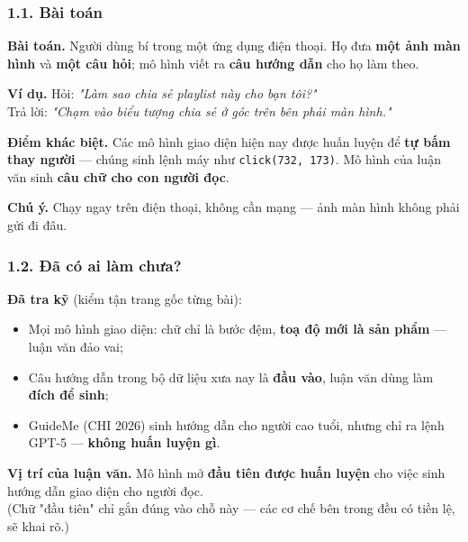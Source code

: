 \documentclass[10pt]{beamer}
\newcommand{\dn}[1]{{\color{dnteal}\textbf{#1}}}
\newcommand{\vd}[1]{{\color{vdblue}\textbf{#1}}}
\newcommand{\ann}[1]{{\color{annmar}\textbf{#1}}}
\newcommand{\nv}[1]{{\color{daunavy}\textbf{#1}}}
\begin{document}
\begin{frame}
  \frametitle{1.1. Bài toán}
  \begin{block}{}
    \dn{Bài toán.} Người dùng bí trong một ứng dụng điện thoại. Họ đưa \nv{một ảnh màn hình} và \nv{một câu hỏi}; mô hình viết ra \nv{câu hướng dẫn} cho họ làm theo.
  \end{block}
  \begin{block}{}
    \vd{Ví dụ.} Hỏi: \textit{"Làm sao chia sẻ playlist này cho bạn tôi?"}\\[1.2ex]
    Trả lời: \textit{"Chạm vào biểu tượng chia sẻ ở góc trên bên phải màn hình."}
  \end{block}
  \vspace{1ex}
  \dn{Điểm khác biệt.} Các mô hình giao diện hiện nay được huấn luyện để \nv{tự bấm thay người} --- chúng sinh lệnh máy như \texttt{click(732,\,173)}. Mô hình của luận văn sinh \nv{câu chữ cho con người đọc}.
  \vspace{1.2ex}

  \ann{Chú ý.} Chạy ngay trên điện thoại, không cần mạng --- ảnh màn hình không phải gửi đi đâu.
\end{frame}

\begin{frame}
  \frametitle{1.2. Đã có ai làm chưa?}
  \begin{block}{}
    \dn{Đã tra kỹ} (kiểm tận trang gốc từng bài):
    \begin{itemize}
      \item Mọi mô hình giao diện: chữ chỉ là bước đệm, \nv{toạ độ mới là sản phẩm} --- luận văn đảo vai;
      \item Câu hướng dẫn trong bộ dữ liệu xưa nay là \nv{đầu vào}, luận văn dùng làm \nv{đích để sinh};
      \item GuideMe (CHI 2026) sinh hướng dẫn cho người cao tuổi, nhưng chỉ ra lệnh GPT-5 --- \nv{không huấn luyện gì}.
    \end{itemize}
  \end{block}
  \begin{block}{}
    \vd{Vị trí của luận văn.} Mô hình mở \nv{đầu tiên được huấn luyện} cho việc sinh hướng dẫn giao diện cho người đọc.\\[0.8ex]
    {\small (Chữ "đầu tiên" chỉ gắn đúng vào chỗ này --- các cơ chế bên trong đều có tiền lệ, sẽ khai rõ.)}
  \end{block}
\end{frame}
\end{document}
